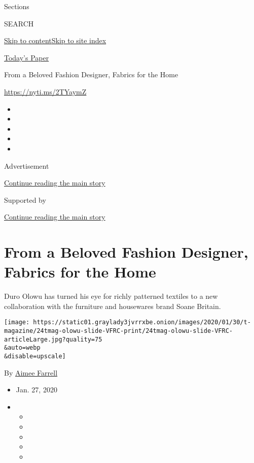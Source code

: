 Sections

SEARCH

\protect\hyperlink{site-content}{Skip to
content}\protect\hyperlink{site-index}{Skip to site index}

\href{https://myaccount.nytimes3xbfgragh.onion/auth/login?response_type=cookie\&client_id=vi}{}

\href{https://www.nytimes3xbfgragh.onion/section/todayspaper}{Today's
Paper}

From a Beloved Fashion Designer, Fabrics for the Home

\url{https://nyti.ms/2TYaymZ}

\begin{itemize}
\item
\item
\item
\item
\item
\end{itemize}

Advertisement

\protect\hyperlink{after-top}{Continue reading the main story}

Supported by

\protect\hyperlink{after-sponsor}{Continue reading the main story}

\hypertarget{from-a-beloved-fashion-designer-fabrics-for-the-home}{%
\section{From a Beloved Fashion Designer, Fabrics for the
Home}\label{from-a-beloved-fashion-designer-fabrics-for-the-home}}

Duro Olowu has turned his eye for richly patterned textiles to a new
collaboration with the furniture and housewares brand Soane Britain.

\texttt{[image: https://static01.graylady3jvrrxbe.onion/images/2020/01/30/t-magazine/24tmag-olowu-slide-VFRC-print/24tmag-olowu-slide-VFRC-articleLarge.jpg?quality=75\\\&auto=webp\\\&disable=upscale]}

By \href{https://www.nytimes3xbfgragh.onion/by/aimee-farrell}{Aimee
Farrell}

\begin{itemize}
\item
  Jan. 27, 2020
\item
  \begin{itemize}
  \item
  \item
  \item
  \item
  \item
  \end{itemize}
\end{itemize}

